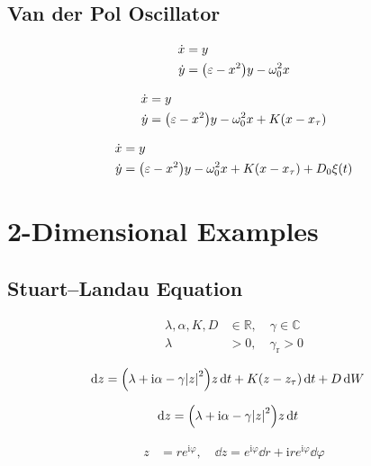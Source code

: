 \documentclass[a4paper,10pt]{article}
\newcommand{\mi}{\mathrm{i}}
\newcommand{\gammar}{\gamma_{\text{r}}}
\begin{document}
\subsection{Van der Pol Oscillator}

\begin{align}
	\dot{x}
	&=
	y
\\
	\dot{y}
	&=
	\pqty{\varepsilon-x^2}
	y
	-
	\omega_0^2
	x
\end{align}

\begin{align}
	\dot{x}
	&=
	y
\\
	\dot{y}
	&=
	\pqty{\varepsilon-x^2}
	y
	-
	\omega_0^2
	x	
	+
	K
	(x-x_\tau)
\end{align}

\begin{align}
	\dot{x}
	&=
	y
\\
	\dot{y}
	&=
	\pqty{\varepsilon-x^2}
	y
	-
	\omega_0^2
	x	
	+
	K
	(x-x_\tau)
	+
	D_0
	\xi(t)
\end{align}

\section{2-Dimensional Examples}

\subsection{Stuart–Landau Equation}

\begin{align*}
	\lambda,\alpha,K,D
	&\in\mathbb{R},
	\quad
	\gamma\in\mathbb{C}
\\
	\lambda
	&>0,
	\quad
	\gammar
	>0
\end{align*}

\begin{align}
	\dd{z}
	&=
	\pqty{
		\lambda
		+
		\mi\alpha
		-
		\gamma\abs{z}^2
	}z
	\dd{t}
	+
	K\pqty{z-z_{\tau}}
	\dd{t}
	+
	D
	\dd{W}
\end{align}

\begin{align}
	\dd{z}
	&=
	\pqty{
		\lambda
		+
		\mi\alpha
		-
		\gamma\abs{z}^2
	}z
	\dd{t}	
\end{align}

\begin{align}
	z
	&=
	r e^{\mi\varphi}
	,\quad
	\dd{z}
	=
	e^{\mi\varphi}
	\dd{r}
	+
	\mi
	r
	e^{\mi\varphi}
	\dd{\varphi}	
\end{align}
\end{document}
